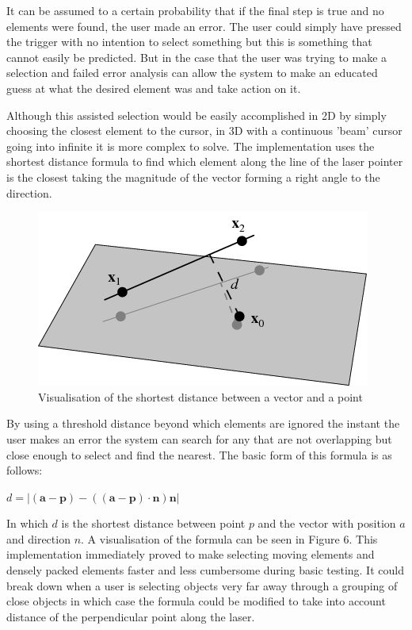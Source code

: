 \documentclass[12pt]{article}
\begin{document}
It can be assumed to a certain probability that if the final step is true and no elements were found, the user made an error. The user could simply have pressed the trigger with no intention to select something but this is something that cannot easily be predicted. But in the case that the user was trying to make a selection and failed error analysis can allow the system to make an educated guess at what the desired element was and take action on it. 

Although this assisted selection would be easily accomplished in 2D by simply choosing the closest element to the cursor, in 3D with a continuous 'beam' cursor going into infinite it is more complex to solve. The implementation uses the shortest distance formula to find which element along the line of the laser pointer is the closest taking the magnitude of the vector forming a right angle to the direction.

\begin{figure}
\centering
  \includegraphics[width=.8\linewidth]{nearestpoint.png}
  \caption{Visualisation of the shortest distance between a vector and a point}
\end{figure}

By using a threshold distance beyond which elements are ignored the instant the user makes an error the system can search for any that are not overlapping but close enough to select and find the nearest. The basic form of this formula is as follows: 

$d = |(\mathbf{a}-\mathbf{p}) - ((\mathbf{a}-\mathbf{p}) \cdot  \mathbf{n})\mathbf{n}|$

In which $d$ is the shortest distance between point $p$ and the vector with position $a$ and direction $n$. A visualisation of the formula can be seen in Figure 6. This implementation immediately proved to make selecting moving elements and densely packed elements faster and less cumbersome during basic testing. It could break down when a user is selecting objects very far away through a grouping of close objects in which case the formula could be modified to take into account distance of the perpendicular point along the laser.
\end{document}
